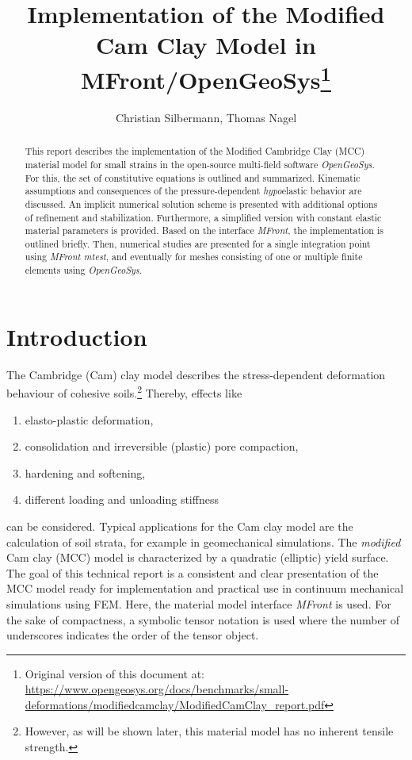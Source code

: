 \documentclass[paper=a4, twoside, pagesize]{scrartcl}
\title{Implementation of the Modified Cam Clay Model in MFront/OpenGeoSys\footnote{Original version of this document at:\\\url{https://www.opengeosys.org/docs/benchmarks/small-deformations/modifiedcamclay/ModifiedCamClay_report.pdf}}}
\author{Christian Silbermann, Thomas Nagel}
\begin{document}
\maketitle

\begin{abstract}
This report describes the implementation of the Modified Cambridge Clay (MCC) material model for small strains in the open-source multi-field software \textsl{OpenGeoSys}. For this, the set of constitutive equations is outlined and summarized. Kinematic assumptions and consequences of the pressure-dependent \emph{hypo}elastic behavior are discussed. An implicit numerical solution scheme is presented with additional options of refinement and stabilization. Furthermore, a simplified version with constant elastic material parameters is provided.
Based on the interface \textsl{MFront}, the implementation is outlined briefly. Then, numerical studies are presented for a single integration point using \textsl{MFront mtest}, and eventually for meshes consisting of one or multiple finite elements using \textsl{OpenGeoSys}. 
\end{abstract}

\section{Introduction}\label{sec:introduction}

The Cambridge (Cam) clay model \cite{Borja1990,Borja1991,Borja1998,Callari1998,Peric2006} describes the stress-dependent deformation behaviour of cohesive soils.\footnote{However, as will be shown later, this material model has no inherent tensile strength.} Thereby, effects like
\begin{enumerate}
  \item elasto-plastic deformation,
  \item consolidation and irreversible (plastic) pore compaction,
  \item hardening and softening,
  \item different loading and unloading stiffness
\end{enumerate}
can be considered. Typical applications for the Cam clay model are the calculation of soil strata, for example in geomechanical simulations. The \emph{modified} Cam clay (MCC) model is characterized by a quadratic (elliptic) yield surface.
The goal of this technical report is a consistent and clear presentation of the MCC model ready for implementation and practical use in continuum mechanical simulations using FEM. Here, the material model interface \textsl{MFront} is used.
For the sake of compactness, a symbolic tensor notation is used where the number of underscores indicates the order of the tensor object.
\end{document}
